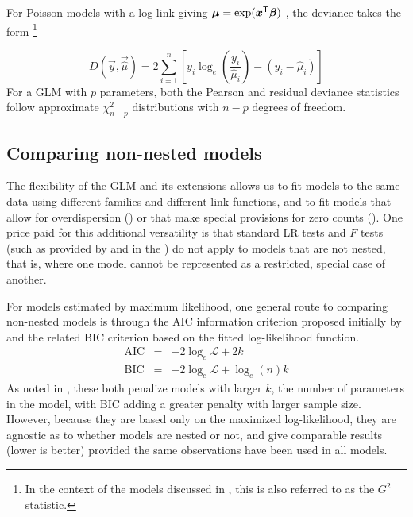 \documentclass[11pt]{book}\usepackage[]{graphicx}\usepackage[]{color}
\begin{document}
For Poisson models with a log link giving $\bm{\mu} = \exp(\bm{x}^\mathsf{T} \bm{\beta})$ , the deviance takes the form%
\footnote{In the context of the \loglin models discussed in , this is also referred to
as the \LR $G^2$ statistic.}

\begin{equation}\label{eq:pois-deviance}
D (\vec{y}, \vec{\widehat{\mu}}) =
  2 \sum_{i=1}^n \left[ y_i \log_e \left( \frac{y_i}{\widehat{\mu}_i} \right) - (y_i - \widehat{\mu}_i) \right]
\end{equation}
For a GLM with $p$ parameters, both the Pearson and residual deviance statistics follow
approximate $\chi^2_{n-p}$ distributions with $n-p$ degrees of freedom.

%

\subsection{Comparing non-nested models}\label{sec:glm-nonnest}

The flexibility of the GLM and its extensions allows us to fit models
to the same data using different families and different link functions, and to
fit models that allow for overdispersion ()
or that make special provisions for zero counts ().
One price paid for this additional versatility is that standard
LR tests and $F$ tests (such as provided by 
and  in the )
do not apply to models that are not nested, that is, where one
model cannot be represented as a restricted, special case of another.

For models estimated by maximum likelihood, one general route to comparing
non-nested models is through the AIC information criterion proposed initially
by \citet{Akaike:73} and the related BIC criterion \citep{Schwartz:78}
based on the fitted log-likelihood function.
\begin{eqnarray}
\textrm{AIC} & = & -2 \log_e \mathcal{L} + 2 k \\
\textrm{BIC} & = & -2 \log_e \mathcal{L} + \log_e(n) k
\end{eqnarray}
As noted in , these both penalize models with larger $k$,
the number of parameters in the model, with BIC adding a greater penalty with
larger sample size.
However, because they are based only on the
maximized log-likelihood, they are agnostic as to whether models are nested or not,
and give comparable results (lower is better) provided the same observations have
been used in all models.
\end{document}
